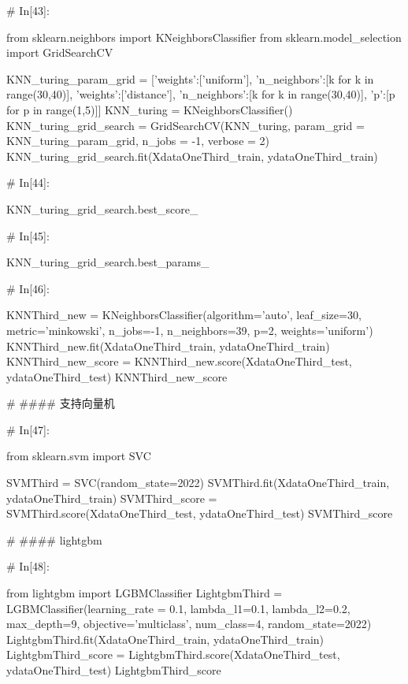 \documentclass{MathorCupmodeling}
\begin{document}
\begin{python}
# In[43]:


from sklearn.neighbors import KNeighborsClassifier
from sklearn.model_selection import GridSearchCV

KNN_turing_param_grid = [{'weights':['uniform'],
                          'n_neighbors':[k for k in range(30,40)]},
                         {'weights':['distance'],
                          'n_neighbors':[k for k in range(30,40)],
                          'p':[p for p in range(1,5)]}]
KNN_turing = KNeighborsClassifier()
KNN_turing_grid_search = GridSearchCV(KNN_turing,
                                      param_grid = KNN_turing_param_grid,
                                      n_jobs = -1,
                                      verbose = 2)
KNN_turing_grid_search.fit(XdataOneThird_train, ydataOneThird_train)


# In[44]:


KNN_turing_grid_search.best_score_


# In[45]:


KNN_turing_grid_search.best_params_


# In[46]:


KNNThird_new = KNeighborsClassifier(algorithm='auto', leaf_size=30,
                                    metric='minkowski',
                                    n_jobs=-1,
                                    n_neighbors=39, p=2,
                                    weights='uniform')
KNNThird_new.fit(XdataOneThird_train, ydataOneThird_train)
KNNThird_new_score = KNNThird_new.score(XdataOneThird_test, ydataOneThird_test)
KNNThird_new_score


# #### 支持向量机

# In[47]:


from sklearn.svm import SVC

SVMThird = SVC(random_state=2022)
SVMThird.fit(XdataOneThird_train, ydataOneThird_train)
SVMThird_score = SVMThird.score(XdataOneThird_test, ydataOneThird_test)
SVMThird_score


# #### lightgbm

# In[48]:


from lightgbm import LGBMClassifier
LightgbmThird = LGBMClassifier(learning_rate = 0.1,
                                lambda_l1=0.1,
                                lambda_l2=0.2,
                                max_depth=9,
                                objective='multiclass',
                                num_class=4,
                                random_state=2022)
LightgbmThird.fit(XdataOneThird_train, ydataOneThird_train)
LightgbmThird_score = LightgbmThird.score(XdataOneThird_test, ydataOneThird_test)
LightgbmThird_score



\end{python}
\end{document}
